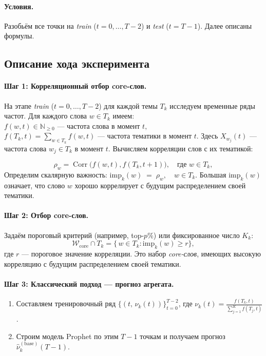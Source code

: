 \documentclass[14pt,a4paper]{article}
\begin{document}
\paragraph{Условия.} Разобьём все точки на \emph{train} (\(t=0,\dots,T-2\)) и \emph{test} (\(t=T-1\)). Далее описаны формулы.






\subsection{Описание хода эксперимента}

\paragraph{Шаг 1: Корреляционный отбор core-слов.}

На этапе \emph{train} (\(t=0,\dots,T-2\)) для каждой темы \(T_k\) исследуем временные ряды частот. Для каждого слова \(w \in T_k\) имеем:
\(
f(w,t) \in \mathbb{N}_{\ge 0} \text{ — частота слова в момент } t,
\)
\(
f(T_k,t) = \sum_{w \in T_k} f(w,t) \text{ — частота тематики в момент } t.
\)
Здесь \(X_{w_j}(t)\) — частота слова \(w_j\in T_k\) в момент \(t\). Вычисляем корреляции слов с их тематикой:

\[
  \rho_w = \operatorname{Corr}\bigl(f(w,t),f(T_k,t+1)\bigr), \quad \text{где } w \in T_k,
\]
Определим скалярную важность:
\(
  \mathrm{imp}_k(w)
  \;=\;
  \rho_w,
  \quad w \in T_k.
\)
Большая \(\mathrm{imp}_k(w)\) означает, что слово \(w\) хорошо коррелирует с будущим распределением своей тематики.

\paragraph{Шаг 2: Отбор core-слов.}

Задаём пороговый критерий (например, top-\(p\%\)) или фиксированное число \(K_k\):
\[
  \mathcal{W}_{\mathrm{core}} \cap T_k
  = 
  \bigl\{\,w\in T_k : \mathrm{imp}_k(w) \ge r\bigr\},
\]
где \(r\) — пороговое значение корреляции. Это набор \emph{core-слов}, имеющих высокую корреляцию с будущим распределением своей тематики.

\paragraph{Шаг 3: Классический подход — прогноз агрегата.}

\begin{enumerate}
  \item Составляем тренировочный ряд \(\{(t,\,\nu_k(t))\}_{t=0}^{T-2}\), где 
  \(\nu_k(t)=\frac{f(T_k,t)}{\sum_{j=1}^K f(T_j,t)}\). 
  \item Строим модель Prophet по этим \(T-1\) точкам и получаем прогноз 
    \(\widehat{\nu}_k^{(\mathrm{base})}(T-1)\).
\end{enumerate}
\end{document}
